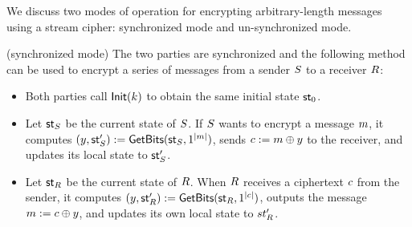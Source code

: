 


\newline

We discuss two modes of operation for encrypting arbitrary-length messages
using a stream cipher: synchronized mode and un-synchronized mode.

(synchronized mode) The two parties are synchronized and the following method
can be used to  encrypt a series of messages from a sender $S$ to a
receiver $R$:
\begin{itemize}
  \item Both parties call $\textsf{Init}(k)$ to obtain the same initial state
        $\textsf{st}_0$.
  \item Let $\textsf{st}_{S}$ be the current state of $S$. If $S$
        wants to encrypt a message $m$, it computes
        $(y, \textsf{st}'_{S}) := \textsf{GetBits}(\textsf{st}_{S}, 1^{|m|})$, sends
        $c := m \oplus y$ to the receiver, and updates its local state to
        $\textsf{st}'_{S}$.
  \item Let $\textsf{st}_{R}$ be the current state of $R$. When
        $R$ receives a ciphertext $c$ from the sender, it computes
        $(y, \textsf{st}'_{R}) := \textsf{GetBits}(\textsf{st}_{R}, 1^{|c|})$,
        outputs the message $m := c \oplus y$, and updates its own local
        state to $st'_{R}$.
\end{itemize}

